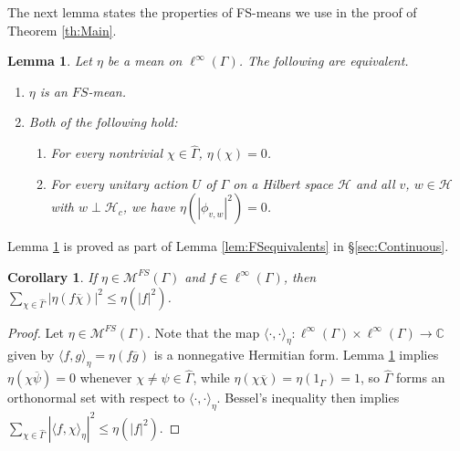 \documentclass[12pt]{amsart} \usepackage{amsmath,centernot,amssymb,leftindex}
\newtheorem{lemma}[theorem]{Lemma}
\newtheorem{corollary}[theorem]{Corollary}
\numberwithin{theorem}{section}
\numberwithin{equation}{section}
\theoremstyle{definition}
\begin{document}
The next lemma states the properties of FS-means we use in the proof of Theorem \ref{th:Main}.
\begin{lemma}\label{lem:RequiredProperties}
	Let $\eta$ be a mean on $\ell^{\infty}(\Gamma)$. The following are equivalent.	
	\begin{enumerate}
		\item $\eta$ is an $FS$-mean.
		\item Both of the following hold:
		
		\begin{enumerate} \item\label{item:HartmanDef} For every nontrivial $\chi\in\widehat{\Gamma}$, $\eta(\chi)=0$.
		
		\item\label{item:Annihilates} For every unitary action $U$ of $\Gamma$ on a Hilbert space $\mathcal H$ and all $v$, $w\in \mathcal H$ with $w\perp \mathcal H_{c}$, we have   $\eta(|\phi_{v,w}|^{2})=0$.
	\end{enumerate}
	\end{enumerate} 
\end{lemma}

Lemma \ref{lem:RequiredProperties} is proved as part of Lemma \ref{lem:FSequivalents} in \S\ref{sec:Continuous}.

\begin{corollary}\label{cor:Bessel}
	If $\eta\in \mathcal M^{FS}(\Gamma)$ and $f\in \ell^{\infty}(\Gamma)$, then $\sum_{\chi\in\widehat{\Gamma}} |\eta(f\overline{\chi})|^{2}\leq \eta(|f|^{2})$.
\end{corollary}
\begin{proof}
Let $\eta\in \mathcal M^{FS}(\Gamma)$. Note that the map $\langle \cdot, \cdot \rangle_{\eta}:\ell^{\infty}(\Gamma)\times \ell^{\infty}(\Gamma) \to \mathbb C$ given by $\langle f, g \rangle_{\eta}=\eta(f\overline{g})$  is a nonnegative Hermitian form.  Lemma \ref{lem:RequiredProperties} implies $\eta(\chi\overline{\psi})=0$ whenever $\chi\neq \psi\in \widehat{\Gamma}$,  while $\eta(\chi\overline{\chi})=\eta(1_{\Gamma})=1$, so $\widehat{\Gamma}$ forms an orthonormal set with respect to $\langle \cdot, \cdot \rangle_{\eta}$.  Bessel's inequality then implies $\sum_{\chi\in\widehat{\Gamma}} |\langle f,\chi\rangle_{\eta}|^{2}\leq   \eta(|f|^{2})$.
\end{proof}
\end{document}
